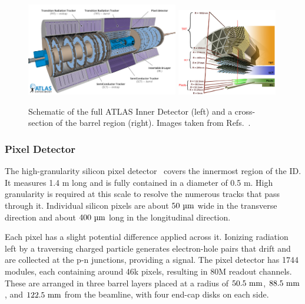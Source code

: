 \begin{figure}[htb]
    \centering
    \includegraphics[width=0.59\textwidth]{Figures/cern_atlas/BetterID.png}
    \includegraphics[width=0.39\textwidth]{Figures/cern_atlas/IDCut.png}
    \caption{Schematic of the full ATLAS Inner Detector (left) and a cross-section of the barrel region (right). Images taken from Refs.~\cite{ATLASRun3,IBLPhotos}.}
    \label{fig:atlas_inner_detector}

\end{figure}

\subsubsection{Pixel Detector}

The high-granularity silicon pixel detector~\cite{ATLASPixel} covers the innermost region of the ID.
It measures 1.4 m long and is fully contained in a diameter of 0.5 m.
High granularity is required at this scale to resolve the numerous tracks that pass through it.
Individual silicon pixels are about $50~\um$ wide in the transverse direction and about $400~\um$ long in the longitudinal direction.

Each pixel has a slight potential difference applied across it.
Ionizing radiation left by a traversing charged particle generates electron-hole pairs that drift and are collected at the p-n junctions, providing a signal.
The pixel detector has 1744 modules, each containing around 46k pixels, resulting in 80M readout channels.
These are arranged in three barrel layers placed at a radius of $50.5~\mm$, $88.5~\mm$, and $122.5~\mm$ from the beamline, with four end-cap disks on each side.

